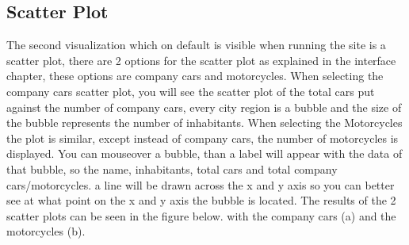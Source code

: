 \documentclass[a4paper,twoside,11pt]{article}
\begin{document}
\subsection{Scatter Plot}
The second visualization which on default is visible when running the site is a scatter plot, there are 2 options for the scatter plot as explained in the interface chapter, these options are company cars and motorcycles. \newline
When selecting the company cars scatter plot, you will see the scatter plot of the total cars put against the number of company cars, every city region is a bubble and the size of the bubble represents the number of inhabitants. When selecting the Motorcycles the plot is similar, except instead of company cars, the number of motorcycles is displayed. You can mouseover a bubble, than a label will appear with the data of that bubble, so the name, inhabitants, total cars and total company cars/motorcycles. a line will be drawn across the x and y axis so you can better see at what point on the x and y axis the bubble is located. \newline
The results of the 2 scatter plots can be seen in the figure below. with the company cars (a) and the motorcycles (b). \newline
\end{document}
